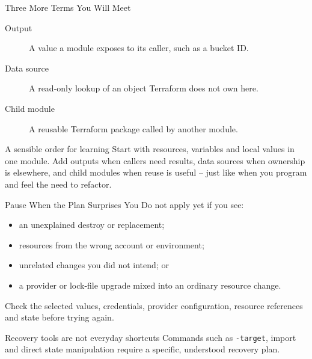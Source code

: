 \documentclass[aspectratio=169, xcolor=table]{beamer}
\begin{document}
\begin{frame}{Three More Terms You Will Meet}
  \begin{description}
    \item[Output] A value a module exposes to its caller, such as a bucket ID.
    \item[Data source] A read-only lookup of an object Terraform does not own here.
    \item[Child module] A reusable Terraform package called by another module.
  \end{description}

  \vspace{0.8em}
  \begin{block}{A sensible order for learning}
    Start with resources, variables and local values in one module. Add outputs when callers
    need results, data sources when ownership is elsewhere, and child modules when reuse is
    useful -- just like when you program and feel the need to refactor.
  \end{block}
\end{frame}

\begin{frame}{Pause When the Plan Surprises You}
  Do not apply yet if you see:

  \vspace{0.5em}
  \begin{itemize}
    \item an unexplained destroy or replacement;
    \item resources from the wrong account or environment;
    \item unrelated changes you did not intend; or
    \item a provider or lock-file upgrade mixed into an ordinary resource change.
  \end{itemize}

  \vspace{0.7em}
  Check the selected values, credentials, provider configuration, resource references and
  state before trying again.

  \begin{alertblock}{Recovery tools are not everyday shortcuts}
    Commands such as \texttt{-target}, import and direct state manipulation require a specific,
    understood recovery plan.
  \end{alertblock}
\end{frame}
\end{document}

